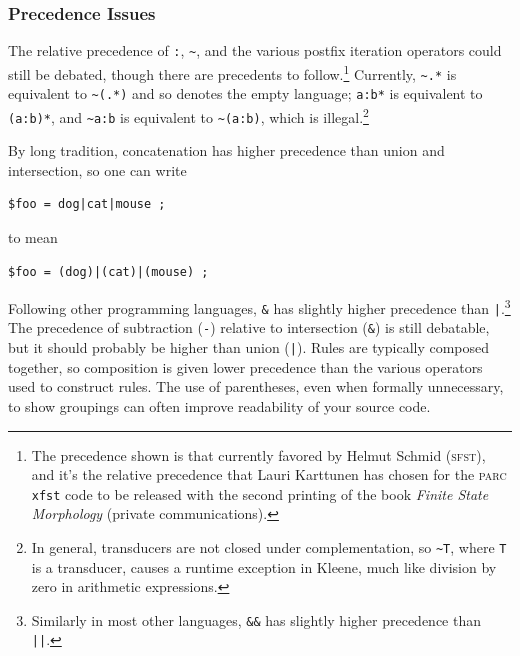 \documentclass[letterpaper,12pt]{article}
\newcommand{\Kleene}{Kleene\xspace}
\newcommand{\acro}{\textsc}
\begin{document}
\vspace{0.5cm}

\subsubsection{Precedence Issues}
 
The relative precedence of  \verb!:!, \verb!~!, and the various postfix
iteration operators could still be debated, though
there are precedents to follow.\footnote{The precedence shown is
that currently favored by Helmut Schmid (\acro{sfst}), and it's the relative precedence that Lauri Karttunen
has chosen for the \acro{parc} \texttt{xfst} code to be released with the second printing of
the book \emph{Finite State Morphology} (private communications).}
Currently, \verb!~.*! is
equivalent to \verb!~(.*)! and so denotes the empty language; \verb!a:b*!
is equivalent to \verb!(a:b)*!, and \verb!~a:b! is equivalent to
\verb!~(a:b)!, which is illegal.\footnote{In general, transducers are not closed under
complementation, so \texttt{\~{}T}, where \texttt{T} is a transducer, causes a
runtime exception in \Kleene{}, much like division by zero in
arithmetic expressions.}

By long tradition, concatenation has higher precedence
than union and intersection, so one can write  

\begin{Verbatim}[fontsize=\small]
$foo = dog|cat|mouse ; 
\end{Verbatim}

\noindent
to mean

\begin{Verbatim}[fontsize=\small]
$foo = (dog)|(cat)|(mouse) ;
\end{Verbatim}

\noindent
Following other programming languages, \verb!&! has slightly higher
precedence than \verb!|!.\footnote{Similarly in most other languages,
\texttt{\&\&}
has slightly higher precedence than \texttt{||}.}
The precedence of subtraction (\verb!-!) relative to intersection
(\verb!&!) is still debatable, but it should probably be higher than
union (\verb!|!).
Rules are typically composed together, so composition is given lower precedence
than the various operators used to construct rules.  The use of
parentheses, even when formally unnecessary, to show groupings can
often improve readability of your source code.
\end{document}
